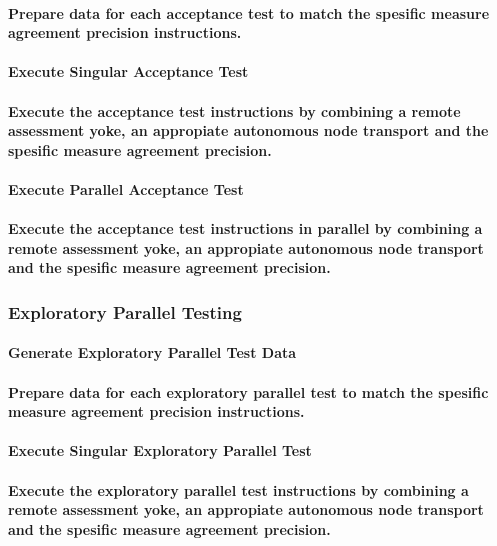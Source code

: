 \paragraph{Prepare data for each acceptance test to match the spesific measure agreement precision instructions.}
\paragraph{Execute Singular Acceptance Test}
\paragraph{Execute the acceptance test instructions by combining a remote assessment yoke, an appropiate autonomous node transport and the spesific measure agreement precision.}
\paragraph{Execute Parallel Acceptance Test}
\paragraph{Execute the acceptance test instructions in parallel by combining a remote assessment yoke, an appropiate autonomous node transport and the spesific measure agreement precision.}
\subsubsection{Exploratory Parallel Testing}
\paragraph{Generate Exploratory Parallel Test Data}
\paragraph{Prepare data for each exploratory parallel test to match the spesific measure agreement precision instructions.}
\paragraph{Execute Singular Exploratory Parallel Test}
\paragraph{Execute the exploratory parallel test instructions by combining a remote assessment yoke, an appropiate autonomous node transport and the spesific measure agreement precision.}

